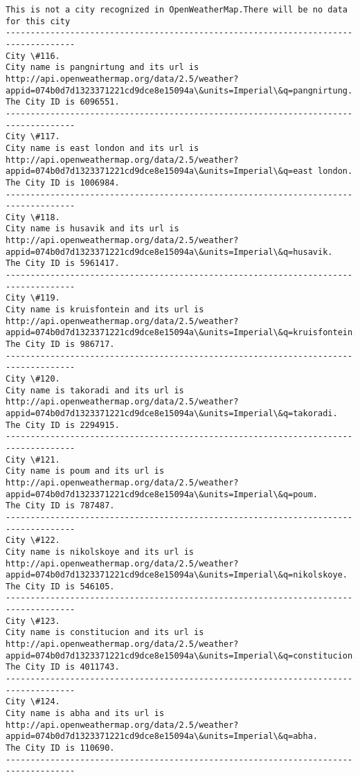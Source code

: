\documentclass[11pt]{article}
\begin{document}
\begin{Verbatim}[commandchars=\\\{\}]
This is not a city recognized in OpenWeatherMap.There will be no data for this city
------------------------------------------------------------------------------------
City \#116.
City name is pangnirtung and its url is http://api.openweathermap.org/data/2.5/weather?appid=074b0d7d1323371221cd9dce8e15094a\&units=Imperial\&q=pangnirtung.
The City ID is 6096551.
------------------------------------------------------------------------------------
City \#117.
City name is east london and its url is http://api.openweathermap.org/data/2.5/weather?appid=074b0d7d1323371221cd9dce8e15094a\&units=Imperial\&q=east london.
The City ID is 1006984.
------------------------------------------------------------------------------------
City \#118.
City name is husavik and its url is http://api.openweathermap.org/data/2.5/weather?appid=074b0d7d1323371221cd9dce8e15094a\&units=Imperial\&q=husavik.
The City ID is 5961417.
------------------------------------------------------------------------------------
City \#119.
City name is kruisfontein and its url is http://api.openweathermap.org/data/2.5/weather?appid=074b0d7d1323371221cd9dce8e15094a\&units=Imperial\&q=kruisfontein.
The City ID is 986717.
------------------------------------------------------------------------------------
City \#120.
City name is takoradi and its url is http://api.openweathermap.org/data/2.5/weather?appid=074b0d7d1323371221cd9dce8e15094a\&units=Imperial\&q=takoradi.
The City ID is 2294915.
------------------------------------------------------------------------------------
City \#121.
City name is poum and its url is http://api.openweathermap.org/data/2.5/weather?appid=074b0d7d1323371221cd9dce8e15094a\&units=Imperial\&q=poum.
The City ID is 787487.
------------------------------------------------------------------------------------
City \#122.
City name is nikolskoye and its url is http://api.openweathermap.org/data/2.5/weather?appid=074b0d7d1323371221cd9dce8e15094a\&units=Imperial\&q=nikolskoye.
The City ID is 546105.
------------------------------------------------------------------------------------
City \#123.
City name is constitucion and its url is http://api.openweathermap.org/data/2.5/weather?appid=074b0d7d1323371221cd9dce8e15094a\&units=Imperial\&q=constitucion.
The City ID is 4011743.
------------------------------------------------------------------------------------
City \#124.
City name is abha and its url is http://api.openweathermap.org/data/2.5/weather?appid=074b0d7d1323371221cd9dce8e15094a\&units=Imperial\&q=abha.
The City ID is 110690.
------------------------------------------------------------------------------------

\end{Verbatim}
\end{document}

